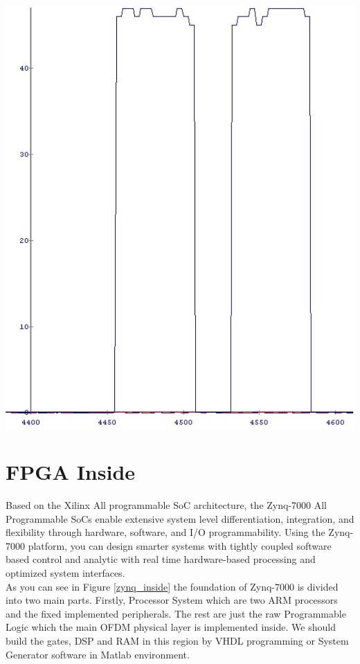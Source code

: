 \begin{center}
\includegraphics[width=\textwidth]{content/fig/h_mag_chipscope.JPG}
\label{h_mag_chipscope}
\end{center}

\section{FPGA Inside}
Based on the Xilinx All programmable SoC architecture, the Zynq-7000 All Programmable SoCs enable extensive system level differentiation, integration, and flexibility through hardware, software, and I/O programmability. Using the Zynq-7000 platform, you can design smarter systems with tightly coupled software based control and analytic with real time hardware-based processing and optimized system interfaces.\\
As you can see in Figure \ref{zynq_inside} the foundation of Zynq-7000 is divided into two main parts. Firstly, Processor System which are two ARM processors and the fixed implemented peripherals. The rest are just the raw Programmable Logic which the main OFDM physical layer is implemented inside. We should build the gates, DSP and RAM in this region by VHDL programming or System Generator software in Matlab environment.\\


